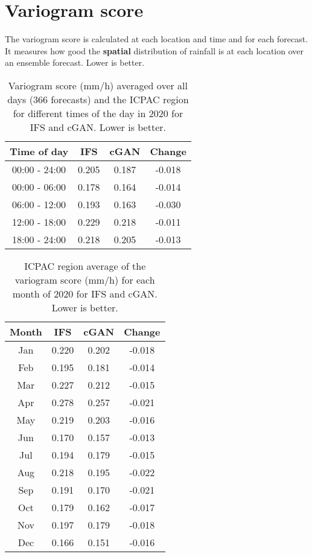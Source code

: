 \documentclass[12pt]{article}
\begin{document}

\section{Variogram score}

The variogram score is calculated at each location and time and for each forecast. It measures how good the {\bf spatial} distribution of rainfall is at each location over an ensemble forecast. Lower is better.

\begin{table}
\centering
\begin{tabular}{|c|c|c|c|}
\hline
Time of day & IFS & cGAN & Change \\
\hline
00:00 - 24:00 & 0.205 & 0.187 & -0.018 \\
\hline
00:00 - 06:00 & 0.178 & 0.164 & -0.014 \\
06:00 - 12:00 & 0.193 & 0.163 & -0.030 \\
12:00 - 18:00 & 0.229 & 0.218 & -0.011 \\
18:00 - 24:00 & 0.218 & 0.205 & -0.013 \\
\hline
\end{tabular}
\caption{Variogram score (mm/h) averaged over all days (366 forecasts) and the ICPAC region for different times of the day in 2020 for IFS and cGAN. Lower is better.}
\end{table}

\begin{table}
\centering
\begin{tabular}{|c|c|c|c|}
\hline
Month & IFS & cGAN & Change \\
\hline
Jan & 0.220 & 0.202 & -0.018 \\
Feb & 0.195 & 0.181 & -0.014 \\
Mar & 0.227 & 0.212 & -0.015 \\
Apr & 0.278 & 0.257 & -0.021 \\
May & 0.219 & 0.203 & -0.016 \\
Jun & 0.170 & 0.157 & -0.013 \\
Jul & 0.194 & 0.179 & -0.015 \\
Aug & 0.218 & 0.195 & -0.022 \\
Sep & 0.191 & 0.170 & -0.021 \\
Oct & 0.179 & 0.162 & -0.017 \\
Nov & 0.197 & 0.179 & -0.018 \\
Dec & 0.166 & 0.151 & -0.016 \\
\hline
\end{tabular}
\caption{ICPAC region average of the variogram score (mm/h) for each month of 2020 for IFS and cGAN. Lower is better.}
\end{table}
\end{document}
